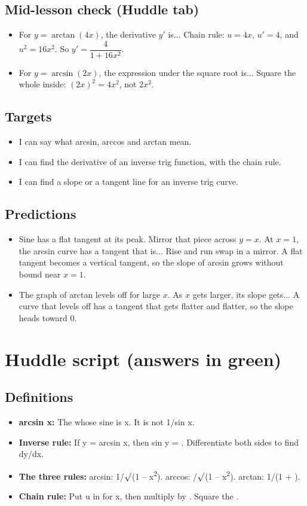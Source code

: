 \documentclass[11pt]{article}
\begin{document}
\subsection*{Mid-lesson check (Huddle tab)}\begin{itemize}
\item For $y=\arctan(4x)$, the derivative $y'$ is...  Chain rule: $u=4x$, $u'=4$, and $u^2=16x^2$. So $y'=\dfrac{4}{1+16x^2}$.
\item For $y=\arcsin(2x)$, the expression under the square root is...  Square the whole inside: $(2x)^2=4x^2$, not $2x^2$.
\end{itemize}
\subsection*{Targets}\begin{itemize}\item I can say what arcsin, arccos and arctan mean.
\item I can find the derivative of an inverse trig function, with the chain rule.
\item I can find a slope or a tangent line for an inverse trig curve.\end{itemize}
\subsection*{Predictions}\begin{itemize}
\item Sine has a flat tangent at its peak. Mirror that piece across $y=x$. At $x=1$, the arcsin curve has a tangent that is...  Rise and run swap in a mirror. A flat tangent becomes a vertical tangent, so the slope of arcsin grows without bound near $x=1$.
\item The graph of arctan levels off for large $x$. As $x$ gets larger, its slope gets...  A curve that levels off has a tangent that gets flatter and flatter, so the slope heads toward 0.
\end{itemize}
\section*{Huddle script (answers in green)}
\subsection*{Definitions}\begin{itemize}
\item \textbf{arcsin x:} The  whose sine is x. It is not 1/sin x.
\item \textbf{Inverse rule:} If y = arcsin x, then sin y = . Differentiate both sides to find dy/dx.
\item \textbf{The three rules:} arcsin: 1/$\surd$(1 -- x\textsuperscript{2}). arccos: /$\surd$(1 -- x\textsuperscript{2}). arctan: 1/(1 + ).
\item \textbf{Chain rule:} Put u in for x, then multiply by . Square the .
\end{itemize}
\end{document}
